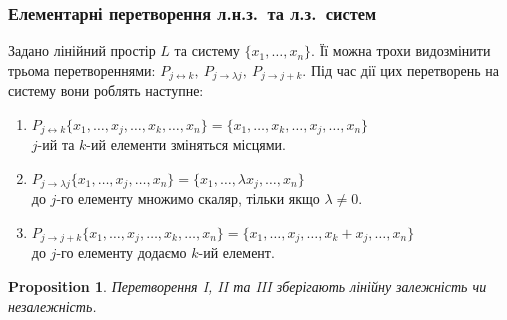 \documentclass[a4paper, 10pt]{article}
\theoremstyle{theoremdd}
\newtheorem{proposition}[theorem]{Proposition}
\begin{document}
	\subsubsection*{Елементарні перетворення л.н.з.\ та л.з.\ систем}
	Задано лінійний простір $L$ та систему $\{x_1, \dots, x_n\}$. Її можна трохи видозмінити трьома перетвореннями: $P_{j \leftrightarrow k},\ P_{j \to \lambda j},\ P_{j \to j+k}$. Під час дії цих перетворень на систему вони роблять наступне:
	\begin{enumerate}[wide = 0pt, label={\Roman*.}]
	\item $P_{j \leftrightarrow k} \{x_1, \dots, x_j, \dots, x_k, \dots, x_n\} = \{x_1, \dots, x_k, \dots, x_j, \dots, x_n\}$\\
	$j$-ий та $k$-ий елементи зміняться місцями.
	\item $P_{j \to \lambda j} \{x_1, \dots, x_j, \dots, x_n\} = \{x_1, \dots, \lambda x_j, \dots, x_n\}$\\
	до $j$-го елементу множимо скаляр, тільки якщо $\lambda \neq 0$.
	\item $P_{j \to j+k} \{x_1, \dots, x_j, \dots, x_k, \dots, x_n\} = \{x_1, \dots, x_j, \dots,  x_k + x_j, \dots, x_n\}$\\
	до $j$-го елементу додаємо $k$-ий елемент.
	\end{enumerate}

	\begin{proposition}
	Перетворення I, II та III зберігають лінійну залежність чи незалежність.
	\end{proposition}
	
\end{document}
